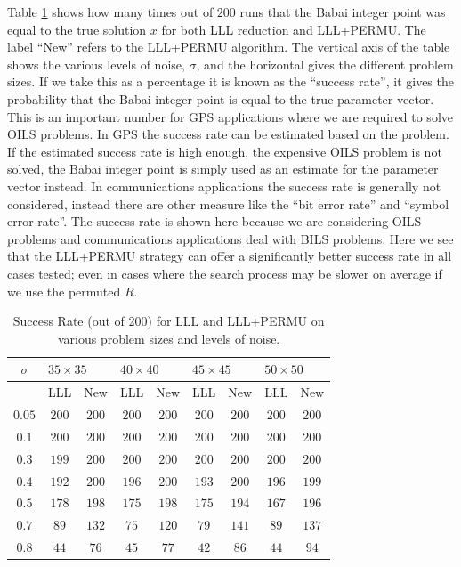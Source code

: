 \documentclass[12pt,Bold,letterpaper]{mcgilletdclass}
\begin{document}
Table \ref{tab:successRates} shows how many times out of $200$ runs that the
Babai integer point was equal to the true solution $x$ for both LLL reduction and
LLL+PERMU. The label ``New'' refers to the LLL+PERMU algorithm. The vertical axis of the table shows the various levels of noise,
$\sigma$, and the horizontal gives the different problem sizes. If we take this
as a percentage it is known as the ``success rate'', it gives the probability that the Babai integer point is equal to the true parameter vector. This is an important number for GPS applications where we are required to solve OILS problems. In GPS the success rate can be estimated based on the problem. If the estimated success rate is high enough, the expensive OILS problem is not solved, the Babai integer point is simply used as an estimate for the parameter vector instead. In communications applications the success rate is generally not considered, instead there are other measure like the ``bit error rate'' and ``symbol error rate''. The success rate is shown here because we are considering OILS problems and communications applications deal with BILS problems. Here we see that the LLL+PERMU strategy can offer a significantly better success rate in all cases tested; even in cases where the search process may be slower on average if we use the permuted $R$.

\begin{table}
\caption{Success Rate (out of 200) for LLL and LLL+PERMU on various problem
sizes and levels of noise.}
\label{tab:successRates}
\begin{tabular}{|c|c|c|c|c|c|c|c|c|}
\hline
$\sigma$&               \multicolumn{2}{|l|}{$35 \times 35$} & \multicolumn{2}{|l|}{$40
\times 40$} &\multicolumn{2}{|l|}{$45 \times 45$} & \multicolumn{2}{|l|}{$50
\times 50$} \\ \hline
&               LLL & New & LLL & New & LLL & New & LLL &
New \\ \hline
$0.05$&         $200$ & $200$ & $200$ & $200$ & $200$ & $200$ & $200$ & $200$ 
\\ \hline        
$0.1$&           $200$ & $200$ & $200$ & $200$ & $200$ & $200$ & $200$ & $200$
\\ \hline
$0.3$&           $199$ & $200$ & $200$ & $200$ & $200$ & $200$ & $200$ & $200$
\\ \hline
$0.4$&           $192$ & $200$ & $196$ & $200$ & $193$ & $200$ & $196$ & $199$
\\ \hline
$0.5$&           $178$ & $198$ & $175$ & $198$ & $175$ & $194$ & $167$ & $196$
\\ \hline
$0.7$&            $89$ & $132$ &  $75$ & $120$ & $79$  & $141$ & $89$  & $137$
\\ \hline
$0.8$&            $44$ &  $76$ &  $45$ &  $77$ & $42$  & $86$  & $44$  & $94$
\\ 
\hline
\end{tabular}
\end{table}
\end{document}
